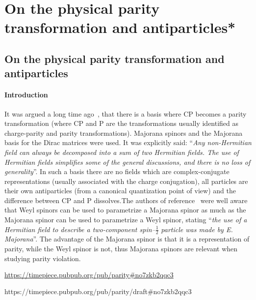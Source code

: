 \documentclass[11pt]{book}
\begin{document}
\chapter{On the physical parity transformation and antiparticles*}
\hypertarget{on-the-physical-parity-transformation-and-antiparticles}{%
\section{On the physical parity transformation and
antiparticles}\label{on-the-physical-parity-transformation-and-antiparticles}}

\hypertarget{introduction}{%
\subsubsection{Introduction}\label{introduction}}

\cite{roberts_2017}\cite{nf57dnfzzw7}

It was argued a long time ago~\cite{Lee1966Space}, that there is a basis where CP becomes a parity
transformation (where CP and P are the transformations usually
identified as charge-parity and parity transformations). Majorana
\protect\hyperlink{nx1oj4uk5fu}{} spinors and the Majorana basis for the
Dirac matrices were used. It was explicitly said: ``\emph{Any
non-Hermitian field can always be decomposed into a sum of two Hermitian
fields. The use of Hermitian fields simplifies some of the general
discussions, and there is no loss of generality}''. In such a basis
there are no fields which are complex-conjugate representations (usually
associated with the charge conjugation), all particles are their own
antiparticles (from a canonical quantization point of view) and the
difference between CP and P dissolves.The authors of
reference~\cite{Lee1966Space} were
well aware that Weyl spinors can be used to parametrize a Majorana
spinor as much as the Majorana spinor can be used to parametrize a Weyl
spinor, stating ``\emph{the use of a Hermitian field to describe a
two-component spin--}\(\frac{1}{2}\)\emph{ particle was made by E.
Majorana}''. The advantage of the Majorana spinor is that it is a
representation of parity, while the Weyl spinor is not, thus Majorana
spinors are relevant when studying parity violation.

\protect\hyperlink{no7zkb2qqc3}{https://timepiece.pubpub.org/pub/parity\#no7zkb2qqc3}

https://timepiece.pubpub.org/pub/parity/draft\#no7zkb2qqc3
\end{document}
